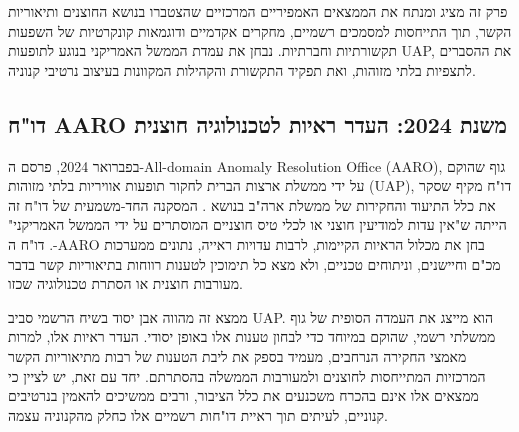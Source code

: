 \documentclass[12pt,a4paper]{article}
\begin{document}
פרק זה מציג ומנתח את הממצאים האמפיריים המרכזיים שהצטברו בנושא החוצנים ותיאוריות הקשר, תוך התייחסות למסמכים רשמיים, מחקרים אקדמיים ודוגמאות קונקרטיות של השפעות תקשורתיות וחברתיות. נבחן את עמדת הממשל האמריקני בנוגע לתופעות UAP, את ההסברים לתצפיות בלתי מזוהות, ואת תפקיד התקשורת והקהילות המקוונות בעיצוב נרטיבי קנוניה.

\subsection{דו"ח AARO משנת 2024: העדר ראיות לטכנולוגיה חוצנית}
בפברואר 2024, פרסם ה-All-domain Anomaly Resolution Office (AARO), גוף שהוקם על ידי ממשלת ארצות הברית לחקור תופעות אוויריות בלתי מזוהות (UAP), דו"ח מקיף שסקר את כלל התיעוד והחקירות של ממשלת ארה"ב בנושא \cite{AARO2024report}. המסקנה החד-משמעית של דו"ח זה הייתה ש"אין עדות למודיעין חוצני או לכלי טיס חוצניים המוסתרים על ידי הממשל האמריקני" \cite{AARO2024report}. דו"ח ה-AARO בחן את מכלול הראיות הקיימות, לרבות עדויות ראייה, נתונים ממערכות מכ"ם וחיישנים, וניתוחים טכניים, ולא מצא כל תימוכין לטענות רווחות בתיאוריות קשר בדבר מעורבות חוצנית או הסתרת טכנולוגיה שכזו.

ממצא זה מהווה אבן יסוד בשיח הרשמי סביב UAP. הוא מייצג את העמדה הסופית של גוף ממשלתי רשמי, שהוקם במיוחד כדי לבחון טענות אלו באופן יסודי. העדר ראיות אלו, למרות מאמצי החקירה הנרחבים, מעמיד בספק את ליבת הטענות של רבות מתיאוריות הקשר המרכזיות המתייחסות לחוצנים ולמעורבות הממשלה בהסתרתם. יחד עם זאת, יש לציין כי ממצאים אלו אינם בהכרח משכנעים את כלל הציבור, ורבים ממשיכים להאמין בנרטיבים קנוניים, לעיתים תוך ראיית דו"חות רשמיים אלו כחלק מהקנוניה עצמה.
\end{document}
